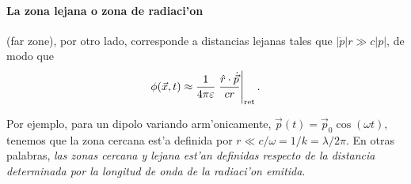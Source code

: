 \paragraph{La \textbf{zona lejana o zona de radiaci'on}} (far zone), por otro lado, corresponde a distancias lejanas tales que $|\dot{p}|r\gg c|p|$, de modo que
\begin{equation}
\phi(\vec{x},t)\approx\frac{1}{4\pi\varepsilon}\left.\frac{\hat{r}\cdot\dot{\vec{p}}}{cr}\right|_{\rm ret}.
\end{equation}

Por ejemplo, para un dipolo variando arm'onicamente, $\vec{p}(t)=\vec{p}_0\cos(\omega t)$, tenemos que la zona cercana est'a definida por $r\ll c/\omega=1/k=\lambda/2\pi$. En otras palabras, \textit{las zonas cercana y lejana est'an definidas respecto de la distancia determinada por la longitud de onda de la radiaci'on emitida}.

